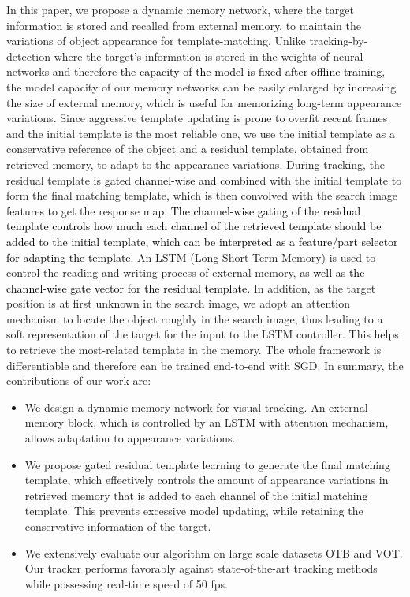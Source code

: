 \documentclass[runningheads]{llncs}
\newcommand{\abc}[1]{\textcolor{black}{#1}}
\newcommand{\ty}[1]{\textcolor{black}{#1}}
\begin{document}
In this paper, we propose a dynamic memory network, where the target information is stored and recalled from  external memory,  to maintain the variations of object appearance for template-matching.
Unlike tracking-by-detection  where the target's information is stored in the weights of neural networks and therefore \ty{the capacity of the model is fixed after offline training}, the model capacity of our memory networks can be easily enlarged by increasing the size of external memory, which is useful for memorizing long-term appearance variations. 
Since aggressive template updating is prone to overfit recent frames and the initial template is the most reliable one,
we use the initial template as a conservative reference of the object and a residual template, %
obtained from retrieved memory, to adapt to the appearance variations.
During tracking, the residual template is %
\abc{gated channel-wise and} 
combined with the initial template to form the final matching template, which is then convolved with the search image features to get the response map.
\abc{The channel-wise gating of the residual template controls how much each channel of the retrieved template should be added to the initial template, which can be interpreted as a feature/part selector for adapting the template.}
An LSTM (Long Short-Term Memory) is used to control the reading and writing process of external memory, 
\abc{as well as the channel-wise gate vector for the residual template.}
In addition, as the target position is at first unknown in the search image, we adopt an attention mechanism to locate the object roughly %
in the search image, thus leading to a soft representation of the target for the input to the LSTM controller. This helps to retrieve the most-related template in the memory. %
The whole framework is differentiable and therefore can be trained end-to-end with SGD. In summary, the contributions of our work are:
\begin{itemize}
	\item We design a dynamic memory network for visual tracking. An external memory block, which is controlled by an LSTM with attention mechanism, allows adaptation to appearance variations. %
	\item We propose \abc{gated} residual template learning to generate the final matching template, which effectively controls the amount of appearance variations in retrieved memory that is added to \abc{each channel of} the initial matching template.
	This prevents excessive model updating, while retaining the conservative information of the target.
	\item We extensively evaluate our algorithm on large scale datasets OTB and VOT. Our tracker performs favorably against state-of-the-art tracking methods while possessing real-time speed of 50 fps.
\end{itemize}
\end{document}
